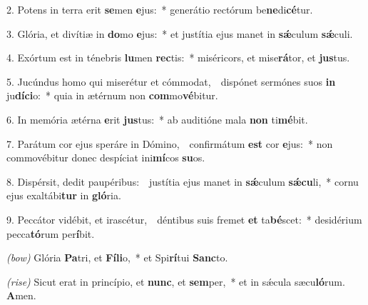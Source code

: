 2. Potens in terra erit \textbf{se}men \textbf{e}jus:~* generátio rectórum be\textbf{ne}di\textbf{cé}tur.

3. Glória, et divítiæ in \textbf{do}mo \textbf{e}jus:~* et justítia ejus manet in \textbf{s\'{\ae}}culum \textbf{s\'{\ae}}culi.

4. Exórtum est in ténebris \textbf{lu}men \textbf{rec}tis:~* miséricors, et mise\textbf{rá}tor, et \textbf{jus}tus.

5. Jucúndus homo qui miserétur et cómmodat,~\GreDagger\ dispónet sermónes suos \textbf{in} ju\textbf{dí}\textbf{ci}o:~* quia in ætérnum non \textbf{com}mo\textbf{vé}bitur.

6. In memória ætérna \textbf{e}rit \textbf{jus}tus:~* ab auditióne mala \textbf{non} ti\textbf{mé}bit.

7. Parátum cor ejus speráre in Dómino,~\GreDagger\ confirmátum \textbf{est} cor \textbf{e}jus:~* non commovébitur donec despíciat ini\textbf{mí}cos \textbf{su}os.

8. Dispérsit, dedit paupéribus:~\GreDagger\ justítia ejus manet in \textbf{s\'{\ae}}culum \textbf{s\'{\ae}}\-\textbf{cu}li,~* cornu ejus exaltábi\textbf{tur} in \textbf{gló}ria.

9. Peccátor vidébit, et irascétur,~\GreDagger\ déntibus suis fremet \textbf{et} ta\textbf{bé}scet:~* desidérium pecca\textbf{tó}rum per\textbf{í}bit.

\textit{(bow)} Glória \textbf{Pa}tri, et \textbf{Fí}\textbf{li}o,~* et Spi\textbf{rí}tui \textbf{Sanc}to.

\textit{(rise)} Sicut erat in princípio, et \textbf{nunc}, et \textbf{sem}per,~* et in s\'{\ae}cula sæcu\textbf{ló}rum. \textbf{A}men.